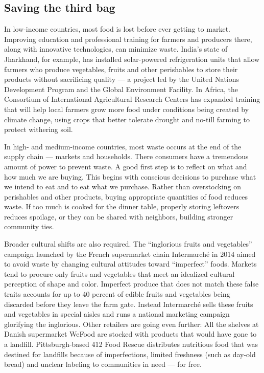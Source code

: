 \documentclass[a4paper]{article}
\begin{document}
\subsection*{Saving the third bag}
In low-income countries, most food is lost before ever getting to market. Improving education and professional training for farmers and producers there, along with innovative technologies, can minimize waste. India's state of Jharkhand, for example, has installed solar-powered refrigeration units that allow farmers who produce vegetables, fruits and other perishables to store their products without sacrificing quality --- a project led by the United Nations Development Program and the Global Environment Facility. In Africa, the Consortium of International Agricultural Research Centers has expanded training that will help local farmers grow more food under conditions being created by climate change, using crops that better tolerate drought and no-till farming to protect withering soil.

In high- and medium-income countries, most waste occurs at the end of the supply chain --- markets and households. There consumers have a tremendous amount of power to prevent waste. A good first step is to reflect on what and how much we are buying. This begins with conscious decisions to purchase what we intend to eat and to eat what we purchase. Rather than overstocking on perishables and other products, buying appropriate quantities of food reduces waste. If too much is cooked for the dinner table, properly storing leftovers reduces spoilage, or they can be shared with neighbors, building stronger community ties.

Broader cultural shifts are also required. The “inglorious fruits and vegetables” campaign launched by the French supermarket chain Intermarché in 2014 aimed to avoid waste by changing cultural attitudes toward “imperfect” foods. Markets tend to procure only fruits and vegetables that meet an idealized cultural perception of shape and color. Imperfect produce that does not match these false traits accounts for up to 40 percent of edible fruits and vegetables being discarded before they leave the farm gate. Instead Intermarché sells these fruits and vegetables in special aisles and runs a national marketing campaign glorifying the inglorious. Other retailers are going even further: All the shelves at Danish supermarket WeFood are stocked with products that would have gone to a landfill. Pittsburgh-based 412 Food Rescue distributes nutritious food that was destined for landfills because of imperfections, limited freshness (such as day-old bread) and unclear labeling to communities in need --- for free.
\end{document}
